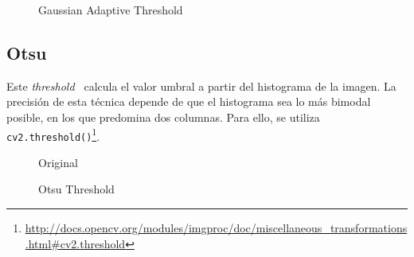 \begin{figure}[H]
  \centering \setlength\fboxsep{0pt} \setlength\fboxrule{0.5pt}
  \caption{Gaussian Adaptive Threshold}
\end{figure}

\subsection{Otsu}\label{tecnica:threshold-otsu}
Este \emph{threshold}\emph{~\citep*[A threshold selection method from
  gray-level histograms]{otsu1975threshold}} calcula el valor umbral a
partir del histograma de la imagen. La precisión de esta técnica
depende de que el histograma sea lo más bimodal posible, en los que
predomina dos columnas. Para ello, se utiliza
\texttt{cv2.threshold()}\footnote{\url{http://docs.opencv.org/modules/imgproc/doc/miscellaneous\_transformations.html\#cv2.threshold}}.

\begin{figure}[H]
  \caption{Original}
  \centering \setlength\fboxsep{0pt} \setlength\fboxrule{0.5pt}
\end{figure}

\begin{figure}[H]
  \centering \setlength\fboxsep{0pt} \setlength\fboxrule{0.5pt}
  \caption{Otsu Threshold}
\end{figure}

